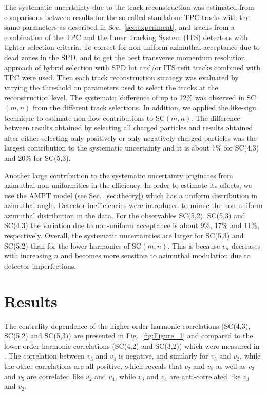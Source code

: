 The systematic uncertainty due to the track reconstruction was estimated from comparisons between results for the so-called standalone TPC tracks with the 
same parameters as described in Sec.~\ref{sec:experiment}, and tracks from a combination of the TPC and the Inner Tracking System (ITS) detectors with tighter selection criteria.
To correct for non-uniform azimuthal acceptance due to dead zones in the SPD, and to get the best transverse momentum resolution, approach of hybrid selection with SPD hit and/or ITS refit tracks combined with TPC were used. Then each track reconstruction strategy was evaluated by varying the threshold on parameters used to select the tracks at the reconstruction level. 
The systematic difference of up to 12\% was observed in SC$(m,n)$ from the different track selections. 
In addition, we applied the like-sign technique to estimate non-flow contributions to SC$(m,n)$. The difference between results obtained by selecting all charged particles and results obtained after either selecting only positively or only negatively charged particles was the largest contribution to the systematic uncertainty and it is about 7\% for SC(4,3) and 20\% for SC(5,3). 

Another large contribution to the systematic uncertainty originates from azimuthal non-uniformities in the efficiency. In order to estimate its effects, we use the AMPT model (see Sec.~\ref{sec:theory}) which has a uniform distribution in azimuthal angle.
Detector inefficiencies were introduced to mimic the non-uniform azimuthal distribution in the data. For the observables SC(5,2), SC(5,3) and SC(4,3) the variation due to non-uniform acceptance is about 9\%, 17\% and 11\%, respectively.
Overall, the systematic uncertainties are larger for SC(5,3) and SC(5,2) than for the lower harmonics of SC$(m,n)$.
This is because $v_{n}$ decreases with increasing $n$ and becomes more sensitive to azimuthal modulation due to detector imperfections. 

\section{Results}
\label{sec:results}

The centrality dependence of the higher order harmonic correlations (SC(4,3), SC(5,2) and SC(5,3)) are presented in Fig.~\ref{fig:Figure_1} and compared to the lower order harmonic correlations (SC(4,2) and SC(3,2)) which were measured in \cite{ALICE:2016kpq}. The correlation between $v_3$ and $v_4$ is negative, and similarly for $v_3$ and $v_2$, while the other correlations are all positive, which reveals that $v_2$ and $v_5$ as well as $v_3$ and $v_5$ are correlated like $v_2$ and $v_4$, while $v_3$ and $v_4$ are anti-correlated like $v_3$ and $v_2$.

